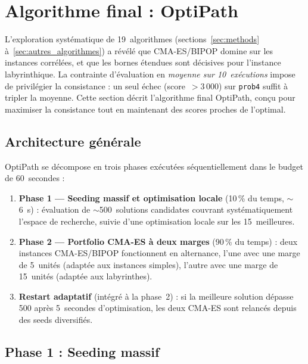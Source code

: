 \section{Algorithme final : OptiPath}
\label{sec:strategie}

L'exploration systématique de 19~algorithmes (sections~\ref{sec:methods}
à~\ref{sec:autres_algorithmes}) a révélé que CMA-ES/BIPOP domine sur les
instances corrélées, et que les bornes étendues sont décisives pour l'instance
labyrinthique.  La contrainte d'évaluation en \emph{moyenne sur 10~exécutions}
impose de privilégier la consistance : un seul échec (score~$> 3\,000$) sur
\texttt{prob4} suffit à tripler la moyenne.  Cette section décrit l'algorithme
final OptiPath, conçu pour maximiser la consistance tout en maintenant des
scores proches de l'optimal.

\subsection{Architecture générale}

OptiPath se décompose en trois phases exécutées séquentiellement dans le budget
de 60~secondes :

\begin{enumerate}
  \item \textbf{Phase 1 — Seeding massif et optimisation locale} (10\,\% du
        temps, $\sim$6~s) : évaluation de $\sim$500~solutions candidates
        couvrant systématiquement l'espace de recherche, suivie d'une
        optimisation locale sur les 15~meilleures.
  \item \textbf{Phase 2 — Portfolio CMA-ES à deux marges} (90\,\% du temps) :
        deux instances CMA-ES/BIPOP fonctionnent en alternance, l'une avec une
        marge de 5~unités (adaptée aux instances simples), l'autre avec une
        marge de 15~unités (adaptée aux labyrinthes).
  \item \textbf{Restart adaptatif} (intégré à la phase~2) : si la meilleure
        solution dépasse 500 après 5~secondes d'optimisation, les deux CMA-ES
        sont relancés depuis des seeds diversifiés.
\end{enumerate}

\subsection{Phase 1 : Seeding massif}

